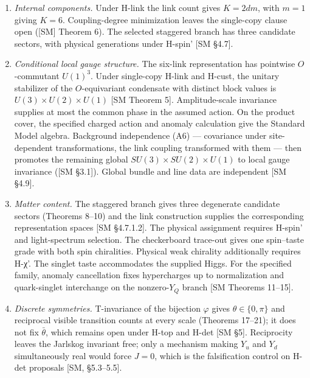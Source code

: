 \documentclass[
]{article}
\begin{document}
\begin{enumerate}
  \(f = \alpha(x_1 + x_2 + \cdots + x_{2d}) \bmod q\) with coupling
  coefficient \(\alpha\). The coefficient is neither the propagation
  speed nor free to be set to \(1\): causal support travels at most one
  lattice edge per update whatever its value, and on the observer-level
  normalized branch it equals \(1/d\) ({[}SM §4.1, Remark{]}).
\item
  \emph{Internal components.} Under H-link the link count gives
  \(K = 2dm\), with \(m=1\) giving \(K=6\). Coupling-degree minimization
  leaves the single-copy clause open ({[}SM{]} Theorem 6). The selected
  staggered branch has three candidate sectors, with physical
  generations under H-spin' {[}SM §4.7{]}.
\item
  \emph{Conditional local gauge structure.} The six-link representation
  has pointwise \(O\)-commutant \(U(1)^3\). Under single-copy H-link and
  H-cust, the unitary stabilizer of the \(O\)-equivariant condensate
  with distinct block values is \(U(3)\times U(2)\times U(1)\) {[}SM
  Theorem 5{]}. Amplitude-scale invariance supplies at most the common
  phase in the assumed action. On the product cover, the specified
  charged action and anomaly calculation give the Standard Model
  algebra. Background independence (A6) --- covariance under
  site-dependent transformations, the link coupling transformed with
  them --- then promotes the remaining global
  \(SU(3) \times SU(2) \times U(1)\) to local gauge invariance ({[}SM
  §3.1{]}). Global bundle and line data are independent {[}SM §4.9{]}.
\item
  \emph{Matter content.} The staggered branch gives three degenerate
  candidate sectors (Theorems 8--10) and the link construction supplies
  the corresponding representation spaces {[}SM §4.7.1.2{]}. The
  physical assignment requires H-spin' and light-spectrum selection. The
  checkerboard trace-out gives one spin--taste grade with both spin
  chiralities. Physical weak chirality additionally requires H-χ'. The
  singlet taste accommodates the supplied Higgs. For the specified
  family, anomaly cancellation fixes hypercharges up to normalization
  and quark-singlet interchange on the nonzero-\(Y_Q\) branch {[}SM
  Theorems 11--15{]}.
\item
  \emph{Discrete symmetries.} T-invariance of the bijection \(\varphi\)
  gives \(\theta\in\{0,\pi\}\) and reciprocal visible transition counts
  at every scale (Theorems 17--21); it does not fix \(\bar\theta\),
  which remains open under H-top and H-det {[}SM §5{]}. Reciprocity
  leaves the Jarlskog invariant free; only a mechanism making \(Y_u\)
  and \(Y_d\) simultaneously real would force \(J=0\), which is the
  falsification control on H-det proposals {[}SM, §5.3--5.5{]}.
\end{enumerate}
\end{document}
